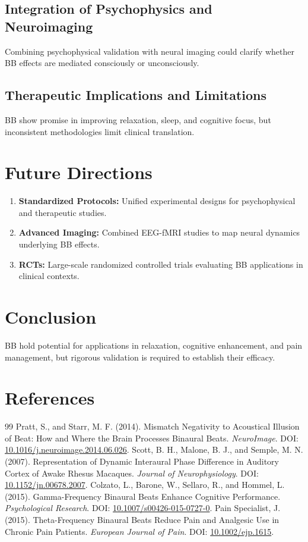 \documentclass[12pt]{article}
\begin{document}
\subsection{Integration of Psychophysics and Neuroimaging}
Combining psychophysical validation with neural imaging could clarify whether BB effects are mediated consciously or unconsciously.

\subsection{Therapeutic Implications and Limitations}
BB show promise in improving relaxation, sleep, and cognitive focus, but inconsistent methodologies limit clinical translation.

\section{Future Directions}
\begin{enumerate}
    \item \textbf{Standardized Protocols:} Unified experimental designs for psychophysical and therapeutic studies.
    \item \textbf{Advanced Imaging:} Combined EEG-fMRI studies to map neural dynamics underlying BB effects.
    \item \textbf{RCTs:} Large-scale randomized controlled trials evaluating BB applications in clinical contexts.
\end{enumerate}

\section{Conclusion}
BB hold potential for applications in relaxation, cognitive enhancement, and pain management, but rigorous validation is required to establish their efficacy.

\section*{References}
\begin{thebibliography}{99}
     Pratt, S., and Starr, M. F. (2014). Mismatch Negativity to Acoustical Illusion of Beat: How and Where the Brain Processes Binaural Beats. \textit{NeuroImage}. DOI: \href{https://doi.org/10.1016/j.neuroimage.2014.06.026}{10.1016/j.neuroimage.2014.06.026}.
     Scott, B. H., Malone, B. J., and Semple, M. N. (2007). Representation of Dynamic Interaural Phase Difference in Auditory Cortex of Awake Rhesus Macaques. \textit{Journal of Neurophysiology}. DOI: \href{https://doi.org/10.1152/jn.00678.2007}{10.1152/jn.00678.2007}.
     Colzato, L., Barone, W., Sellaro, R., and Hommel, L. (2015). Gamma-Frequency Binaural Beats Enhance Cognitive Performance. \textit{Psychological Research}. DOI: \href{https://doi.org/10.1007/s00426-015-0727-0}{10.1007/s00426-015-0727-0}.
     Pain Specialist, J. (2015). Theta-Frequency Binaural Beats Reduce Pain and Analgesic Use in Chronic Pain Patients. \textit{European Journal of Pain}. DOI: \href{https://doi.org/10.1002/ejp.1615}{10.1002/ejp.1615}.
\end{thebibliography}
\end{document}
